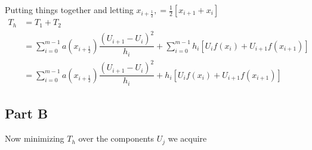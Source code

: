 \documentclass[12pt]{article}
\begin{document}
Putting things together and letting $x_{i+\frac{1}{2}}, = \frac{1}{2}\left[x_{i+1}+x_{i}\right]$
\begin{subequations}
    \begin{align}
        T_{h} &= T_{1} + T_{2}\\
        &= \sum\limits_{i=0}^{m-1}a\left(x_{i+\frac{1}{2}}\right)\dfrac{\left(U_{i+1}-U_{i}\right)^{2}}{h_{i}}
        +  \sum\limits_{i=0}^{m-1} h_{i}\left[U_{i}f(x_{i})+U_{i+1}f(x_{i+1})\right]\\
        &= \sum\limits_{i=0}^{m-1}a\left(x_{i+\frac{1}{2}}\right)\dfrac{\left(U_{i+1}-U_{i}\right)^{2}}{h_{i}}
        +  h_{i}\left[U_{i}f(x_{i})+U_{i+1}f(x_{i+1})\right]
    \end{align}
\end{subequations}

\subsection*{Part B}
Now minimizing $T_{h}$ over the components $U_{j}$ we acquire
\end{document}
